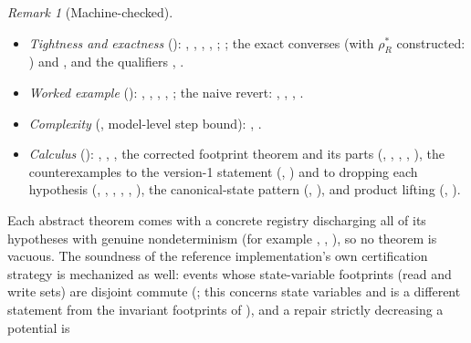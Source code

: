 \documentclass[11pt,a4paper]{article}
\theoremstyle{plain}
\theoremstyle{definition}
\theoremstyle{remark}
\newtheorem{remark}[theorem]{Remark}
\renewcommand{\_}{\textunderscore\allowbreak}
\begin{document}
\begin{remark}[Machine-checked]
\begin{itemize}[leftmargin=*,nosep]
  instance on~$\mathbb{Z}$ (, ).
\item \emph{Tightness and exactness} ():
  , , ,
  , ; ;
  the exact converses  (with $\rho_R^*$ constructed:
  ) and , and the qualifiers
  , .
\item \emph{Worked example} (): ,
  , , , ;
  the naive revert: , ,
  , .
\item \emph{Complexity} (, model-level step bound):
  , .
\item \emph{Calculus} (): ,
  , , the
  corrected footprint theorem and its parts (,
  , ,
  , ), the
  counterexamples to the version-1 statement
  (,
  ) and to dropping each hypothesis
  (, ,
  , ,
  , ), the
  canonical-state pattern (,
  ), and product lifting
  (, ).
\end{itemize}
Each abstract theorem comes with a concrete registry discharging all of its
hypotheses with genuine nondeterminism (for example ,
, ), so no theorem is vacuous.
The soundness of the reference implementation's own certification strategy
is mechanized as well: events whose state-variable footprints (read and
write sets) are disjoint commute (; this concerns
state variables and is a different statement from the invariant footprints of
), and a repair strictly decreasing a potential is

\end{remark}
\end{document}
